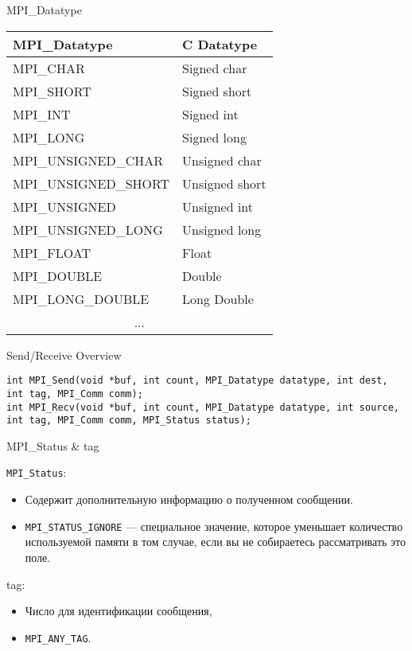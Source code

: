 \begin{frame}{MPI_Datatype}
\begin{table}[htpb]
    \begin{center}
    \begin{tabular}{|l|l|}
    \hline
    MPI_Datatype        &   C Datatype      \\
    \hline
    MPI_CHAR            &   Signed char     \\
    MPI_SHORT           &   Signed short    \\
    MPI_INT             &   Signed int      \\
    MPI_LONG            &   Signed long     \\
    MPI_UNSIGNED_CHAR   &   Unsigned char   \\
    MPI_UNSIGNED_SHORT  &   Unsigned short  \\
    MPI_UNSIGNED        &   Unsigned int    \\
    MPI_UNSIGNED_LONG   &   Unsigned long   \\
    MPI_FLOAT           &   Float           \\
    MPI_DOUBLE          &   Double          \\
    MPI_LONG_DOUBLE     &   Long Double     \\
    \multicolumn{2}{|c|}{...}               \\
    \hline
    \end{tabular}
    \end{center}
\end{table}
\end{frame}

\begin{frame}[fragile]{Send/Receive Overview}
\begin{lstlisting}
int MPI_Send(void *buf, int count, MPI_Datatype datatype, int dest, int tag, MPI_Comm comm);
int MPI_Recv(void *buf, int count, MPI_Datatype datatype, int source, int tag, MPI_Comm comm, MPI_Status status);
\end{lstlisting}
\end{frame}

\begin{frame}{MPI_Status \& tag}

\texttt{MPI_Status}:

\begin{itemize}
    \item Содержит дополнительную информацию о полученном сообщении.
    \item \texttt{MPI_STATUS_IGNORE} --- специальное значение, которое уменьшает количество используемой памяти в том случае, если вы не собираетесь рассматривать это поле.
\end{itemize}

\vfill

tag:

\begin{itemize}
    \item Число для идентификации сообщения,
    \item \texttt{MPI_ANY_TAG}.
\end{itemize}

\end{frame}

